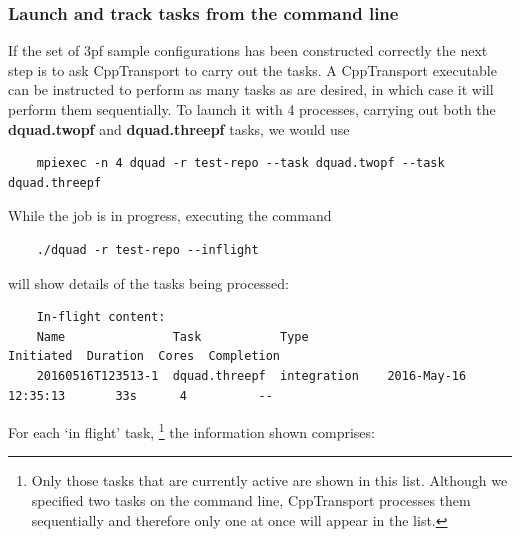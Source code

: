 \documentclass[11pt,a4paper]{article}
\newcommand{\repoobject}[1]{{\ttfamily\bfseries\small #1}}
\newcommand{\packagefont}{\sffamily}
\newcommand{\CppTransport}{{\packagefont CppTransport}}
\begin{document}
\subsubsection{Launch and track tasks from the command line}
If the set of 3pf sample configurations has been constructed correctly
the next step is to ask {\CppTransport} to carry out the tasks.
A {\CppTransport} executable can be instructed to
perform as many tasks as are desired,
in which case it will perform them sequentially.
To launch it with 4 processes, carrying out both the
\repoobject{dquad.twopf} and
\repoobject{dquad.threepf} tasks, we would use
\begin{verbatim}
    mpiexec -n 4 dquad -r test-repo --task dquad.twopf --task dquad.threepf    
\end{verbatim}
While the job is in progress, executing the command
\begin{verbatim}
    ./dquad -r test-repo --inflight    
\end{verbatim}
will show details of the tasks being processed:
\begin{verbatim}
    In-flight content:
    Name               Task           Type                      Initiated  Duration  Cores  Completion
    20160516T123513-1  dquad.threepf  integration    2016-May-16 12:35:13       33s      4          --
\end{verbatim}
For each `in flight' task,%
    \footnote{Only those tasks that
    are currently active are shown in this list. Although we specified
    two tasks on the command line, {\CppTransport} processes them sequentially and therefore
    only one at once will appear in the list.}
the information shown comprises:
\end{document}
